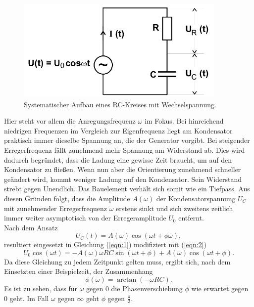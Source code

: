\begin{figure}[H]
  \centering
  \includegraphics[height=5cm]{kreis2.png}
  \caption{Systematischer Aufbau eines RC-Kreises mit Wechselspannung. \cite{sample}}
  \label{fig:2}
\end{figure}

Hier steht vor allem die Anregungsfrequenz $\omega$ im Fokus.
Bei hinreichend niedrigen Frequenzen im Vergleich zur Eigenfrequenz liegt am Kondensator praktisch immer dieselbe Spannung an, die der Generator vorgibt.
Bei steigender Erregerfrequenz fällt zunehmend mehr Spannung am Widerstand ab.
Dies wird dadurch begründet, dass die Ladung eine gewisse Zeit braucht, um auf den Kondensator zu fließen.
Wenn nun aber die Orientierung zunehmend schneller geändert wird, kommt weniger Ladung auf den Kondensator.
Sein Widerstand strebt gegen Unendlich.
Das Bauelement verhält sich somit wie ein Tiefpass.
Aus diesen Gründen folgt, dass die Amplitude $A(\omega)$ der Kondensatorspannung $U_C$ mit zunehmender Erregerfrequenz $\omega$ erstens sinkt und sich zweitens zeitlich immer weiter asymptotisch von der Erregeramplitude $U_0$ entfernt.\\
Nach dem Ansatz
\begin{equation}
  U_C(t) = A(\omega)\cos(\omega t+\phi{\omega}),
\end{equation}
resultiert eingesetzt in Gleichung (\ref{eqn:1}) modifiziert mit (\ref{eqn:2})
\begin{equation}
  U_0\cos(\omega t) = -A(\omega)\omega RC\sin(\omega t + \phi) + A(\omega)\cos(\omega t+\phi). \label{eqn:3}
\end{equation}
Da diese Gleichung zu jedem Zeitpunkt gelten muss, ergibt sich, nach dem Einsetzten einer Beispielzeit, der Zusammenhang
\begin{equation}
  \phi(\omega) = \arctan(-\omega RC). \label{eqn:4}
\end{equation}
Es ist zu sehen, dass für $\omega$ gegen $0$ die Phasenverschiebung $\phi$ wie erwartet gegen $0$ geht.
Im Fall $\omega$ gegen $\infty$ geht $\phi$ gegen $\frac{\pi}{2}$.
